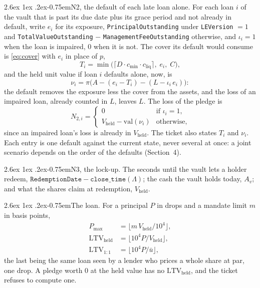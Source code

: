 \documentclass[11pt]{article}
\makeatletter
\renewcommand\paragraph{\@startsection{paragraph}{4}{\z@}%
  {2.6ex \@plus 1ex \@minus .2ex}{-0.75em}{\normalfont\normalsize\bfseries}}
\theoremstyle{orma}
\theoremstyle{ormaupright}
\makeatother
\begin{document}
\paragraph{N2, the default of each late loan alone.} For each loan $i$ of the vault that is
past its due date plus its grace period and not already in default, write $e_i$ for its
exposure, \texttt{PrincipalOutstanding} under \texttt{LEVersion} $=1$ and
\texttt{TotalValueOutstanding} $-$ \texttt{ManagementFeeOutstanding} otherwise, and
$\iota_i = 1$ when the loan is impaired, $0$ when it is not. The cover its default would
consume is \eqref{eq:cover} with $e_i$ in place of $p$,
\begin{equation}
  T_i = \min\Big( \big\lceil D \cdot c_{\min} \cdot c_{\mathrm{liq}} \big\rceil,\; e_i,\; C \Big),
\end{equation}
and the held unit value if loan $i$ defaults alone, now, is
\begin{equation}
  \nu_i = \pi\Big( A - (e_i - T_i) - (L - \iota_i \, e_i) \Big):
\end{equation}
the default removes the exposure less the cover from the assets, and the loss of an
impaired loan, already counted in $L$, leaves $L$. The loss of the pledge is
\begin{equation}
  N_{2,i} = \begin{cases}
    0 & \text{if } \iota_i = 1, \\
    V_{\mathrm{held}} - \mathrm{val}(\nu_i) & \text{otherwise},
  \end{cases}
\end{equation}
since an impaired loan's loss is already in $V_{\mathrm{held}}$. The ticket also states
$T_i$ and $\nu_i$. Each entry is one default against the current state, never several at
once: a joint scenario depends on the order of the defaults (Section~4).

\paragraph{N3, the lock-up.} The seconds until the vault lets a holder redeem,
$\texttt{RedemptionDate} - \texttt{close\_time}(\Lambda)$; the cash the vault holds today,
$A_v$; and what the shares claim at redemption, $V_{\mathrm{held}}$.

\paragraph{The loan.} For a principal $P$ in drops and a mandate limit $m$ in basis points,
\begin{align}
  P_{\max} &= \big\lfloor m \, V_{\mathrm{held}} / 10^{4} \big\rfloor,
  \\[4pt]
  \mathrm{LTV}_{\mathrm{held}} &= \big\lfloor 10^{4} P / V_{\mathrm{held}} \big\rfloor,
  \\[4pt]
  \mathrm{LTV}_{1:1} &= \big\lfloor 10^{4} P / \bar u \big\rfloor ,
\end{align}
the last being the same loan seen by a lender who prices a whole share at par, one drop. A
pledge worth $0$ at the held value has no $\mathrm{LTV}_{\mathrm{held}}$, and the ticket
refuses to compute one.
\end{document}
